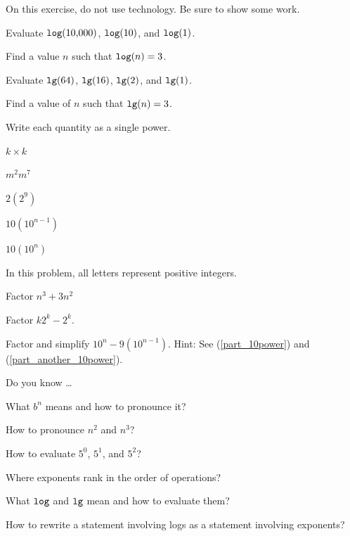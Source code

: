 \begin{exer}[\exerP] %
\label{exer_eval_logs} 
    On this exercise, do not use technology.  Be sure to show some work. 
        \begin{exerpart} 
            \item Evaluate $\texttt{log}(\text{10,000})$, $\texttt{log}(10)$, and $\texttt{log}(1)$.
            \item Find a value $n$ such that $\texttt{log}(n) = 3$.
            \item Evaluate $\texttt{lg}(64)$, $\texttt{lg}(16)$, $\texttt{lg}(2)$, and $\texttt{lg}(1)$.
            \item Find a value of $n$ such that $\texttt{lg}(n) = 3$. 
        \end{exerpart}
\end{exer}

\begin{exer} [\exerU] %
\label{exer_single_power}  
    Write each quantity as a single power.
    \begin{exerpart}
        \item $k \times k$
        \item $m^2m^7$
        \item $2 (2^9)$
        \item \label{part_10power} $10(10^{n-1})$
        \item \label{part_another_10power} $10(10^n)$
    \end{exerpart}
\end{exer}

\begin{exer} [\exerU] %
\label{exer_factoring_powers}
In this problem, all letters represent positive integers.
    \begin{exerpart}
        \item Factor $n^3 + 3n^2$
        \item Factor $k2^k -2^k$.
        \item Factor and simplify $10^n-9(10^{n-1})$.  Hint: See  (\ref{part_10power}) and (\ref{part_another_10power}).
    \end{exerpart}
\end{exer}

\begin{exer}[\exerR] %
\label{exer_dyk_exp_log}
    Do you know \ldots
        \begin{exerpart}
            \item What $b^n$ means and how to pronounce it?
            \item How to pronounce $n^2$ and $n^3$?
            \item How to evaluate $5^0$, $5^1$, and $5^2$?
            \item Where exponents rank in the order of operations?
           \item What $\texttt{log}$ and $\texttt{lg}$ mean and how to evaluate them?
           \item How to rewrite a statement involving logs as a statement involving exponents? 
        \end{exerpart}
\end{exer}


